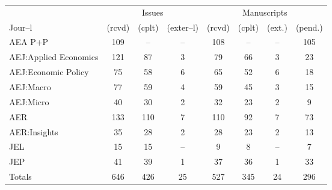 
\begin{tabular}{@{\extracolsep{5pt}} lccccccc} 
\toprule 
        &\multicolumn{3}{c}{Issues}  & \multicolumn{4}{c}{Manuscripts}\\
        \cline{2-4} \cline{5-8}
Jour--l &  (rcvd) &  (cplt) &  (exter--l) &  (rcvd) &  (cplt) &  (ext.) &  (pend.) \\ 
\midrule AEA P+P & 109 & -- & -- & 108 & -- & -- & 105 \\ 
AEJ:Applied Economics & 121 & 87 & 3 & 79 & 66 & 3 & 23 \\ 
AEJ:Economic Policy & 75 & 58 & 6 & 65 & 52 & 6 & 18 \\ 
AEJ:Macro & 77 & 59 & 4 & 59 & 45 & 3 & 15 \\ 
AEJ:Micro & 40 & 30 & 2 & 32 & 23 & 2 & 9 \\ 
AER & 133 & 110 & 7 & 110 & 92 & 7 & 73 \\ 
AER:Insights & 35 & 28 & 2 & 28 & 23 & 2 & 13 \\ 
JEL & 15 & 15 & -- & 9 & 8 & -- & 7 \\ 
JEP & 41 & 39 & 1 & 37 & 36 & 1 & 33 \\ 
\midrule
Totals & 646 & 426 & 25 & 527 & 345 & 24 & 296 \\ 
\bottomrule 
\end{tabular} 
